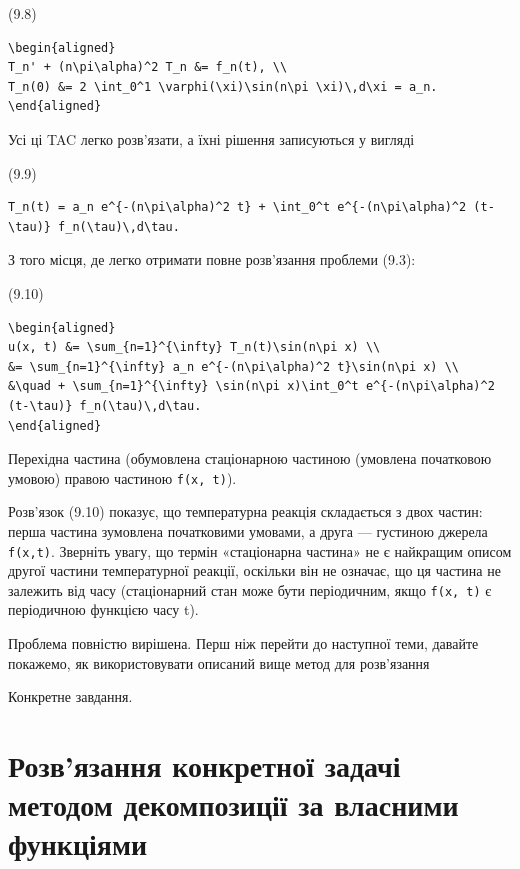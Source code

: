 \documentclass[
  ukrainian,
]{article}
\begin{document}
(9.8)

\begin{verbatim}
\begin{aligned}
T_n' + (n\pi\alpha)^2 T_n &= f_n(t), \\
T_n(0) &= 2 \int_0^1 \varphi(\xi)\sin(n\pi \xi)\,d\xi = a_n.
\end{aligned}
\end{verbatim}

Усі ці TAC легко розв'язати, а їхні рішення записуються у вигляді

(9.9)

\begin{verbatim}
T_n(t) = a_n e^{-(n\pi\alpha)^2 t} + \int_0^t e^{-(n\pi\alpha)^2 (t-\tau)} f_n(\tau)\,d\tau.
\end{verbatim}

З того місця, де легко отримати повне розв'язання проблеми (9.3):

(9.10)

\begin{verbatim}
\begin{aligned}
u(x, t) &= \sum_{n=1}^{\infty} T_n(t)\sin(n\pi x) \\
&= \sum_{n=1}^{\infty} a_n e^{-(n\pi\alpha)^2 t}\sin(n\pi x) \\
&\quad + \sum_{n=1}^{\infty} \sin(n\pi x)\int_0^t e^{-(n\pi\alpha)^2 (t-\tau)} f_n(\tau)\,d\tau.
\end{aligned}
\end{verbatim}

Перехідна частина (обумовлена стаціонарною частиною (умовлена початковою
умовою) правою частиною \texttt{f(x,\ t)}).

Розв'язок (9.10) показує, що температурна реакція складається з двох
частин: перша частина зумовлена початковими умовами, а друга ---
густиною джерела \texttt{f(x,t)}. Зверніть увагу, що термін «стаціонарна
частина» не є найкращим описом другої частини температурної реакції,
оскільки він не означає, що ця частина не залежить від часу
(стаціонарний стан може бути періодичним, якщо \texttt{f(x,\ t)} є
періодичною функцією часу t).

Проблема повністю вирішена. Перш ніж перейти до наступної теми, давайте
покажемо, як використовувати описаний вище метод для розв'язання

Конкретне завдання.

\section{Розв'язання конкретної задачі методом декомпозиції за власними
функціями}\label{ux440ux43eux437ux432ux44fux437ux430ux43dux43dux44f-ux43aux43eux43dux43aux440ux435ux442ux43dux43eux457-ux437ux430ux434ux430ux447ux456-ux43cux435ux442ux43eux434ux43eux43c-ux434ux435ux43aux43eux43cux43fux43eux437ux438ux446ux456ux457-ux437ux430-ux432ux43bux430ux441ux43dux438ux43cux438-ux444ux443ux43dux43aux446ux456ux44fux43cux438}
\end{document}
